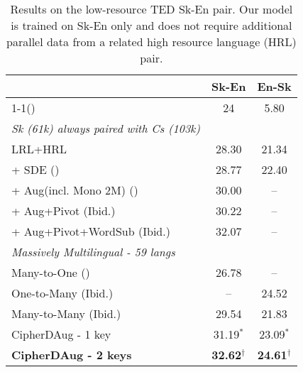 \documentclass[11pt]{article}
\begin{document}
\begin{table}[!htb]
\footnotesize
\centering
\begin{tabular}{lcc}
\toprule
\textbf{ }           & \textbf{Sk-En} & \textbf{En-Sk} \\ \midrule
1-1(\citeauthor{neubig-hu-2018-rapid, aharoni-etal-2019-massively})    & 24             & 5.80            \\
\hline
\scriptsize{\emph{Sk (61k) always paired with Cs (103k)}} & & \\
LRL+HRL             & 28.30           & 21.34          \\
+ SDE (\citeauthor{wang2018multilingual, gao-etal-2020-improving})              & 28.77          & 22.40           \\ 
+ Aug(incl. Mono 2M) (\citeauthor{xia-etal-2019-generalized})    & 30.00  & --           \\
+ Aug+Pivot (Ibid.)             & 30.22   & --           \\
+ Aug+Pivot+WordSub (Ibid.)   & 32.07   & --           \\\midrule
\scriptsize{\emph{Massively Multilingual - 59 langs}} & & \\
Many-to-One (\citeauthor{aharoni-etal-2019-massively})        & 26.78          & --             \\
One-to-Many (Ibid.)        & --             & 24.52          \\
Many-to-Many (Ibid.)       & 29.54          & 21.83          \\ \midrule
CipherDAug - 1 key & 31.19$^*$ & 23.09$^*$ \\
\textbf{CipherDAug - 2 keys} & \textbf{32.62}$^\dagger$ & \textbf{24.61}$^\dagger$ \\
\bottomrule
\end{tabular}
\caption{Results on the low-resource TED \cite{qi-etal-2018-pre} Sk-En pair. Our model is trained on Sk-En only and does not require additional parallel data from a related high resource language (HRL) pair. 
}
\label{tab:lrl}
\vspace{-2em}
\end{table}
\end{document}

